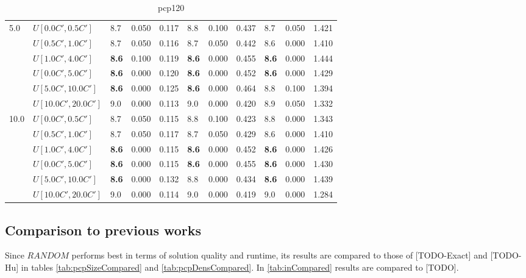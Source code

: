 \begin{table}[h]
{\begin{tabular}{|l|l||l|l|l||l|l|l||l|l|l|}
      \hline\hline
      \multirow{6}{*}{5.0} & $U[0.0C',0.5C']$ & 8.7 & 0.050 & 0.117 & 8.8 & 0.100 & 0.437 & 8.7 & 0.050 & 1.421 \\
       & $U[0.5C',1.0C']$ & 8.7 & 0.050 & 0.116 & 8.7 & 0.050 & 0.442 & 8.6 & 0.000 & 1.410 \\
       & $U[1.0C',4.0C']$ & \textbf{8.6} & 0.100 & 0.119 & \textbf{8.6} & 0.000 & 0.455 & \textbf{8.6} & 0.000 & 1.444 \\
       & $U[0.0C',5.0C']$ & \textbf{8.6} & 0.000 & 0.120 & \textbf{8.6} & 0.000 & 0.452 & \textbf{8.6} & 0.000 & 1.429 \\
       & $U[5.0C',10.0C']$ & \textbf{8.6} & 0.000 & 0.125 & \textbf{8.6} & 0.000 & 0.464 & 8.8 & 0.100 & 1.394 \\
       & $U[10.0C',20.0C']$ & 9.0 & 0.000 & 0.113 & 9.0 & 0.000 & 0.420 & 8.9 & 0.050 & 1.332 \\
      \hline\hline
      \multirow{6}{*}{10.0} & $U[0.0C',0.5C']$ & 8.7 & 0.050 & 0.115 & 8.8 & 0.100 & 0.423 & 8.8 & 0.000 & 1.343 \\
       & $U[0.5C',1.0C']$ & 8.7 & 0.050 & 0.117 & 8.7 & 0.050 & 0.429 & 8.6 & 0.000 & 1.410 \\
       & $U[1.0C',4.0C']$ & \textbf{8.6} & 0.000 & 0.115 & \textbf{8.6} & 0.000 & 0.452 & \textbf{8.6} & 0.000 & 1.426 \\
       & $U[0.0C',5.0C']$ & \textbf{8.6} & 0.000 & 0.115 & \textbf{8.6} & 0.000 & 0.455 & \textbf{8.6} & 0.000 & 1.430 \\
       & $U[5.0C',10.0C']$ & \textbf{8.6} & 0.000 & 0.132 & 8.8 & 0.000 & 0.434 & \textbf{8.6} & 0.000 & 1.439 \\
       & $U[10.0C',20.0C']$ & 9.0 & 0.000 & 0.114 & 9.0 & 0.000 & 0.419 & 9.0 & 0.000 & 1.284 \\
      \hline
      \end{tabular}
      }
      \caption{pcp120}
      \label{tab:pcpn120RecoloredTT}\end{table}

\clearpage

\subsection{Comparison to previous works}
Since $RANDOM$ performs best in terms of solution quality and runtime, its results are compared to those of [TODO-Exact] and [TODO-Hu] in tables \ref{tab:pcpSizeCompared} and \ref{tab:pcpDensCompared}. In \ref{tab:inCompared} results are compared to [TODO].

